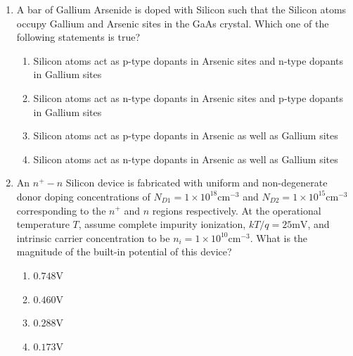 \documentclass[journal,12pt,onecolumn]{IEEEtran}
\theoremstyle{remark}
\begin{document}
\begin{enumerate}
\item A bar of Gallium Arsenide  is doped with Silicon such that the Silicon atoms occupy Gallium and Arsenic sites in the GaAs crystal. Which one of the following statements is true?  
\begin{enumerate}
\item Silicon atoms act as p-type dopants in Arsenic sites and n-type dopants in Gallium sites
\item Silicon atoms act as n-type dopants in Arsenic sites and p-type dopants in Gallium sites
\item Silicon atoms act as p-type dopants in Arsenic as well as Gallium sites
\item Silicon atoms act as n-type dopants in Arsenic as well as Gallium sites
\end{enumerate}
\hfill {}

\item An $n^+-n$ Silicon device is fabricated with uniform and non-degenerate donor doping concentrations of $N_{D1} = 1 \times 10^{18} \text{cm}^{-3}$ and $N_{D2} = 1 \times 10^{15} \text{cm}^{-3}$ corresponding to the $n^+$ and $n$ regions respectively. At the operational temperature $T$, assume complete impurity ionization, $kT/q = 25 \text{mV}$, and intrinsic carrier concentration to be $n_i = 1 \times 10^{10} \text{cm}^{-3}$. What is the magnitude of the built-in potential of this device?  

\begin{multicols}{4}
\begin{enumerate}
\item $0.748 \text{V}$
\item $0.460 \text{V}$
\item $0.288 \text{V}$
\item $0.173 \text{V}$
\end{enumerate}
\end{multicols}
\hfill {}


\end{enumerate}
\end{document}
